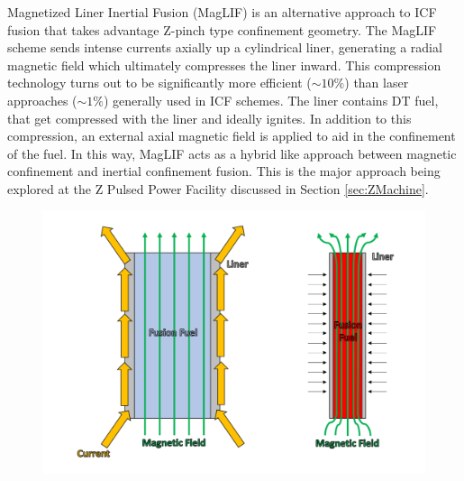 Magnetized Liner Inertial Fusion (MagLIF) is an alternative approach to ICF fusion that takes advantage Z-pinch type confinement geometry. The MagLIF scheme sends intense currents axially up a cylindrical liner, generating a radial magnetic field which ultimately compresses the liner inward. This compression technology turns out to be significantly more efficient ($\sim10\%$) than laser approaches ($\sim1\%$) generally used in ICF schemes. The liner contains DT fuel, that get compressed with the liner and ideally ignites. In addition to this compression, an external axial magnetic field is applied to aid in the confinement of the fuel. In this way, MagLIF acts as a hybrid like approach between magnetic confinement and inertial confinement fusion. This is the major approach being explored at the Z Pulsed Power Facility discussed in Section \ref{sec:ZMachine}.

\begin{figure}[h!]
	\centering
	\includegraphics[scale=0.3]{Figures/magLIF.pdf}
	\caption{}
	\label{fig:MagLIF}
\end{figure}

